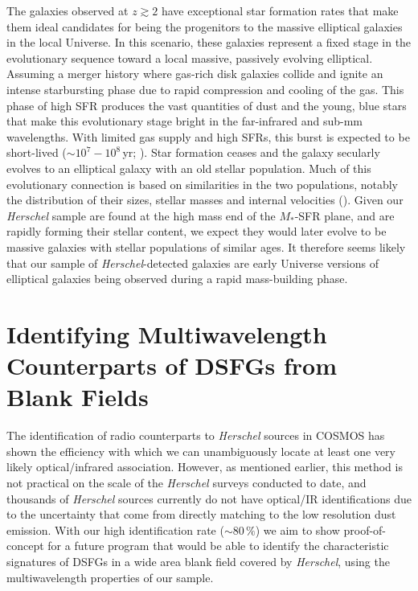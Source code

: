 The galaxies observed at $z \gtrsim 2$ have exceptional star formation rates that make them ideal candidates for being the progenitors to the massive elliptical galaxies in the local Universe. In this scenario, these galaxies represent a fixed stage in the evolutionary sequence toward a local massive, passively evolving elliptical. Assuming a merger history where gas-rich disk galaxies collide and ignite an intense starbursting phase due to rapid compression and cooling of the gas. This phase of high SFR produces the vast quantities of dust and the young, blue stars that make this evolutionary stage bright in the far-infrared and sub-mm wavelengths. With limited gas supply and high SFRs, this burst is expected to be short-lived ($\sim 10^7 - 10^8\,$yr; \citealt{Greve_2005, Tacconi_2006, Hickox_2012}). Star formation ceases and the galaxy secularly evolves to an elliptical galaxy with an old stellar population. Much of this evolutionary connection is based on similarities in the two populations, notably the distribution of their sizes, stellar masses and internal velocities (\citealt{Toft_2014}). Given our \textit{Herschel} sample are found at the high mass end of the $M_*$-SFR plane, and are rapidly forming their stellar content, we expect they would later evolve to be massive galaxies with stellar populations of similar ages. It therefore seems likely that our sample of \textit{Herschel}-detected galaxies are early Universe versions of elliptical galaxies being observed during a rapid mass-building phase.

\section{Identifying Multiwavelength Counterparts of DSFGs from Blank Fields}

The identification of radio counterparts to \textit{Herschel} sources in COSMOS has shown the efficiency with which we can unambiguously locate at least one very likely optical/infrared association. However, as mentioned earlier, this method is not practical on the scale of the \textit{Herschel} surveys conducted to date, and thousands of \textit{Herschel} sources currently do not have optical/IR identifications due to the uncertainty that come from directly matching to the low resolution dust emission. With our high identification rate ($\sim 80\,\%$) we aim to show proof-of-concept for a future program that would be able to identify the characteristic signatures of DSFGs in a wide area blank field covered by \textit{Herschel}, using the multiwavelength properties of our sample.

